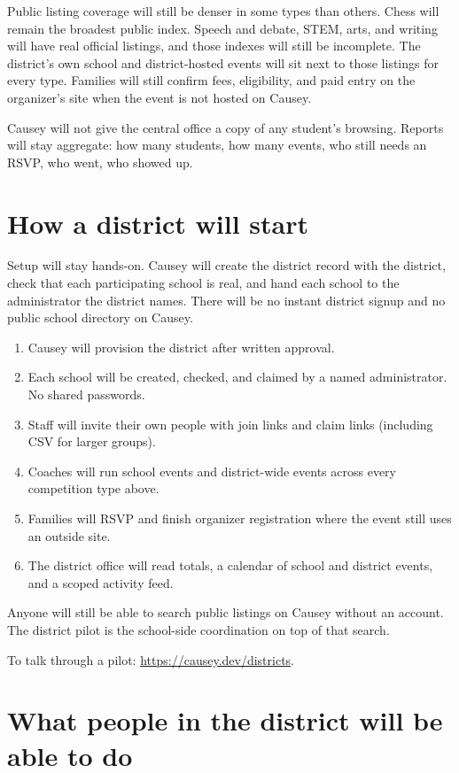 \documentclass[11pt]{article}
\begin{document}
Public listing coverage will still be denser in some types than others. Chess will remain the broadest public index. Speech and debate, STEM, arts, and writing will have real official listings, and those indexes will still be incomplete. The district's own school and district-hosted events will sit next to those listings for every type. Families will still confirm fees, eligibility, and paid entry on the organizer's site when the event is not hosted on Causey.

Causey will not give the central office a copy of any student's browsing. Reports will stay aggregate: how many students, how many events, who still needs an RSVP, who went, who showed up.

\section*{How a district will start}

Setup will stay hands-on. Causey will create the district record with the district, check that each participating school is real, and hand each school to the administrator the district names. There will be no instant district signup and no public school directory on Causey.

\begin{enumerate}
  \item Causey will provision the district after written approval.
  \item Each school will be created, checked, and claimed by a named administrator. No shared passwords.
  \item Staff will invite their own people with join links and claim links (including CSV for larger groups).
  \item Coaches will run school events and district-wide events across every competition type above.
  \item Families will RSVP and finish organizer registration where the event still uses an outside site.
  \item The district office will read totals, a calendar of school and district events, and a scoped activity feed.
\end{enumerate}

Anyone will still be able to search public listings on Causey without an account. The district pilot is the school-side coordination on top of that search.

To talk through a pilot: \url{https://causey.dev/districts}.

\section*{What people in the district will be able to do}
\end{document}
